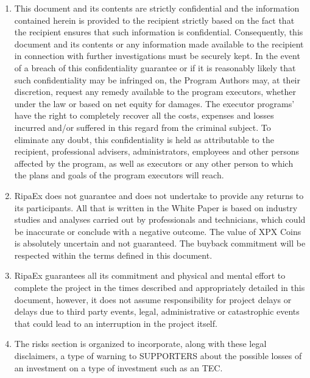 \documentclass[11pt,fleqn,oneside]{book} %
\begin{document}
\begin{scriptsize}
{\begin{enumerate}
			expectations regarding its position in the economy, future
			operations, profitability, liquidity, assets and financial
			position. All of these statements are based on estimates
			and assumptions made by the program’s executors who,
			although considered reasonable, are subject to risks and
			uncertainties that may cause real events and that the
			results of the programs’ executors are materially different
			from those anticipated or indicated by such declarations
			and estimates and no guarantees may be given that any
			such statements or estimates will be made. In the light of
			these and other uncertainties, the inclusion of a forwardlooking
			statement in this document or the White Paper
			itself should not be considered as a representation or a
			guarantee by the TEC in any case.
			\item This document and its contents are strictly confidential
			and the information contained herein is provided to the recipient
			strictly based on the fact that the recipient ensures
			that such information is confidential.
			Consequently, this document and its contents or any
			information made available to the recipient in connection
			with further investigations must be securely kept. In the
			event of a breach of this confidentiality guarantee or if it is 
			reasonably likely that such confidentiality may be infringed
			on, the Program Authors may, at their discretion, request
			any remedy available to the program executors, whether
			under the law or based on net equity for damages. The
			executor programs’ have the right to completely recover all
			the costs, expenses and losses incurred and/or suffered
			in this regard from the criminal subject. To eliminate any
			doubt, this confidentiality is held as attributable to the
			recipient, professional advisers, administrators, employees
			and other persons affected by the program, as well as executors
			or any other person to which the plans and goals
			of the program executors will reach.
			\item RipaEx does not guarantee and does not undertake to
			provide any returns to its participants. All that is written in
			the White Paper is based on industry studies and analyses
			carried out by professionals and technicians, which could
			be inaccurate or conclude with a negative outcome.
			The value of XPX Coins is absolutely uncertain and not
			guaranteed.
			The buyback commitment will be respected within the
			terms defined in this document.
			\item RipaEx guarantees all its commitment and physical and mental
			effort to complete the project in the times described
			and appropriately detailed in this document, however,
			it does not assume responsibility for project delays or
			delays due to third party events, legal, administrative or
			catastrophic events that could lead to an interruption in
			the project itself.
			\item The risks section is organized to incorporate, along with
			these legal disclaimers, a type of warning to SUPPORTERS
			about the possible losses of an investment on a type of
			investment such as an TEC.
		\end{enumerate}		
	}
\end{scriptsize}
\end{document}
